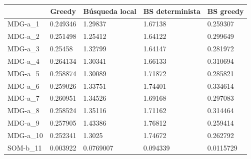 \documentclass[11pt,a4paper]{article}
\begin{document}
	\begin{table}[H]
		\begin{tabular}{l|l|l|l|l|}
			\cline{2-5}
			& \multicolumn{1}{c|}{Greedy} & \multicolumn{1}{c|}{Búsqueda local} & \multicolumn{1}{c|}{BS determinista} & \multicolumn{1}{c|}{BS greedy} \\ \hline
			\multicolumn{1}{|l|}{MDG-a\_1}  & 0.249346                    & 1.29837                             & 1.67138                              & 0.259307                       \\ \hline
			\multicolumn{1}{|l|}{MDG-a\_2}  & 0.251498                    & 1.25412                             & 1.64122                              & 0.299649                       \\ \hline
			\multicolumn{1}{|l|}{MDG-a\_3}  & 0.25458                     & 1.32799                             & 1.64147                              & 0.281972                       \\ \hline
			\multicolumn{1}{|l|}{MDG-a\_4}  & 0.264134                    & 1.30341                             & 1.66133                              & 0.310694                       \\ \hline
			\multicolumn{1}{|l|}{MDG-a\_5}  & 0.258874                    & 1.30089                             & 1.71872                              & 0.285821                       \\ \hline
			\multicolumn{1}{|l|}{MDG-a\_6}  & 0.259026                    & 1.33751                             & 1.74401                              & 0.334614                       \\ \hline
			\multicolumn{1}{|l|}{MDG-a\_7}  & 0.260951                    & 1.34526                             & 1.69168                              & 0.297083                       \\ \hline
			\multicolumn{1}{|l|}{MDG-a\_8}  & 0.258524                    & 1.35116                             & 1.71162                              & 0.314464                       \\ \hline
			\multicolumn{1}{|l|}{MDG-a\_9}  & 0.257905                    & 1.43386                             & 1.76812                              & 0.259414                       \\ \hline
			\multicolumn{1}{|l|}{MDG-a\_10} & 0.252341                    & 1.3025                              & 1.74672                              & 0.262792                       \\ \hline
			\multicolumn{1}{|l|}{SOM-b\_11} & 0.003922                    & 0.0769007                           & 0.094339                             & 0.0115729                      \\ \hline

\end{tabular}
\end{table}
\end{document}
